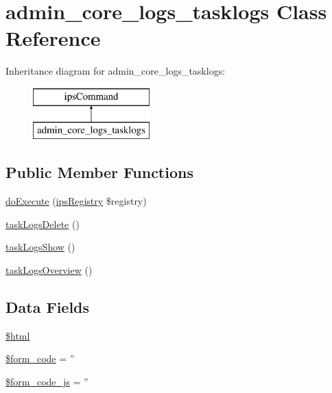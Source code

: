 \hypertarget{classadmin__core__logs__tasklogs}{\section{admin\-\_\-core\-\_\-logs\-\_\-tasklogs Class Reference}
\label{classadmin__core__logs__tasklogs}
}
Inheritance diagram for admin\-\_\-core\-\_\-logs\-\_\-tasklogs\-:\begin{figure}[H]
\begin{center}
\leavevmode
\includegraphics[height=2.000000cm]{classadmin__core__logs__tasklogs}
\end{center}
\end{figure}
\subsection*{Public Member Functions}
\begin{DoxyCompactItemize}
\item 
\hyperlink{classadmin__core__logs__tasklogs_afbc4e912a0604b94d47d66744c64d8ba}{do\-Execute} (\hyperlink{classips_registry}{ips\-Registry} \$registry)
\item 
\hyperlink{classadmin__core__logs__tasklogs_ae3db0ace09a3a70612a19118f1d03ae5}{task\-Logs\-Delete} ()
\item 
\hyperlink{classadmin__core__logs__tasklogs_ab87f7c537ba309d2caf35fc9249a22a8}{task\-Logs\-Show} ()
\item 
\hyperlink{classadmin__core__logs__tasklogs_aa5cdd91edf063f1ed6e77ac095b80372}{task\-Logs\-Overview} ()
\end{DoxyCompactItemize}
\subsection*{Data Fields}
\begin{DoxyCompactItemize}
\item 
\hyperlink{classadmin__core__logs__tasklogs_a6f96e7fc92441776c9d1cd3386663b40}{\$html}
\item 
\hyperlink{classadmin__core__logs__tasklogs_af28aee726fa3eb6c355d08a2ab655e03}{\$form\-\_\-code} = ''
\item 
\hyperlink{classadmin__core__logs__tasklogs_ac68fe8a02a2efd63c3271179f4b4fbb7}{\$form\-\_\-code\-\_\-js} = ''
\end{DoxyCompactItemize}
